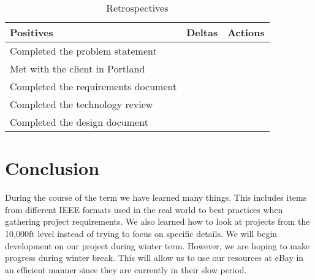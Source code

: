 \documentclass[journal,compsoc, 10pt, draftclsnofoot, onecolumn]{IEEEtran}
\begin{document}
\begin{table}[!h]
\centering
\caption{Retrospectives}
\label{my-label}
\begin{tabularx}{\textwidth}{X|X|X}
\hline
\textbf{Positives} & \textbf{Deltas} & \textbf{Actions} \\ \hline
Completed the problem statement                  &                 &                  \\ \hline
Met with the client in Portland                  &                 &                  \\ \hline
Completed the requirements document                  &                 &                  \\ \hline
Completed the technology review                 &                 &                  \\ \hline
Completed the design document                  &                 &                  \\ \hline
\end{tabularx}
\end{table}

\FloatBarrier
\section{Conclusion}
During the course of the term we have learned many things. This includes items from different IEEE formats used in the real world to best practices when gathering project requirements. We also learned how to look at projects from the 10,000ft level instead of trying to focus on specific details. We will begin development on our project during winter term. However, we are hoping to make progress during winter break. This will allow us to use our resources at eBay in an efficient manner since they are currently in their slow period.
\end{document}
